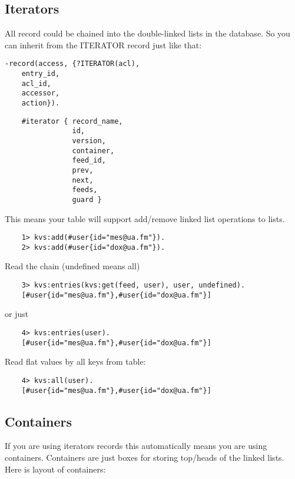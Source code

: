 \newpage
\subsection{Iterators}

All record could be chained into the double-linked lists in the database.
So you can inherit from the ITERATOR record just like that:

\begin{lstlisting}
-record(access, {?ITERATOR(acl),
    entry_id,
    acl_id,
    accessor,
    action}).
\end{lstlisting}

\begin{lstlisting}
    #iterator { record_name,
                id,
                version,
                container,
                feed_id,
                prev,
                next,
                feeds,
                guard }
\end{lstlisting}

This means your table will support add/remove linked list operations to lists.

\begin{lstlisting}
    1> kvs:add(#user{id="mes@ua.fm"}).
    2> kvs:add(#user{id="dox@ua.fm"}).
\end{lstlisting}

Read the chain (undefined means all)

\begin{lstlisting}
    3> kvs:entries(kvs:get(feed, user), user, undefined).
    [#user{id="mes@ua.fm"},#user{id="dox@ua.fm"}]
\end{lstlisting}

or just

\begin{lstlisting}
    4> kvs:entries(user).
    [#user{id="mes@ua.fm"},#user{id="dox@ua.fm"}]
\end{lstlisting}

Read flat values by all keys from table:

\begin{lstlisting}
    4> kvs:all(user).
    [#user{id="mes@ua.fm"},#user{id="dox@ua.fm"}]
\end{lstlisting}

\subsection{Containers}

If you are using iterators records this automatically
means you are using containers. Containers are just boxes
for storing top/heads of the linked lists. Here is layout
of containers:

